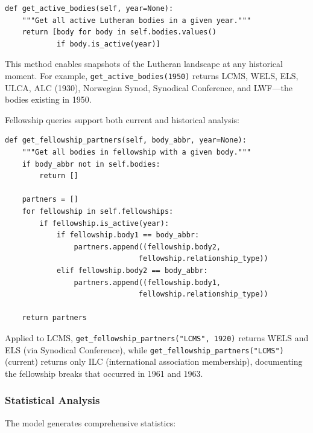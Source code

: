 \begin{verbatim}
def get_active_bodies(self, year=None):
    """Get all active Lutheran bodies in a given year."""
    return [body for body in self.bodies.values()
            if body.is_active(year)]
\end{verbatim}

This method enables snapshots of the Lutheran landscape at any historical moment. For example, \texttt{get\_active\_bodies(1950)} returns LCMS, WELS, ELS, ULCA, ALC (1930), Norwegian Synod, Synodical Conference, and LWF---the bodies existing in 1950.

Fellowship queries support both current and historical analysis:

\begin{verbatim}
def get_fellowship_partners(self, body_abbr, year=None):
    """Get all bodies in fellowship with a given body."""
    if body_abbr not in self.bodies:
        return []

    partners = []
    for fellowship in self.fellowships:
        if fellowship.is_active(year):
            if fellowship.body1 == body_abbr:
                partners.append((fellowship.body2,
                               fellowship.relationship_type))
            elif fellowship.body2 == body_abbr:
                partners.append((fellowship.body1,
                               fellowship.relationship_type))

    return partners
\end{verbatim}

Applied to LCMS, \texttt{get\_fellowship\_partners("LCMS", 1920)} returns WELS and ELS (via Synodical Conference), while \texttt{get\_fellowship\_partners("LCMS")} (current) returns only ILC (international association membership), documenting the fellowship breaks that occurred in 1961 and 1963.

\subsubsection{Statistical Analysis}

The model generates comprehensive statistics:

